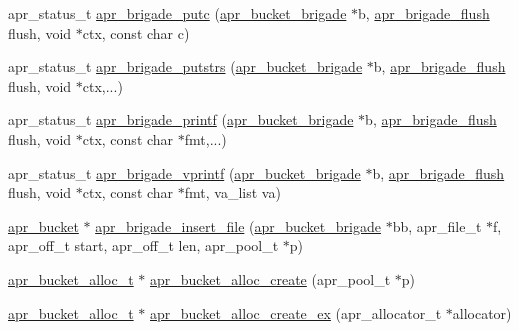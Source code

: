 \begin{DoxyCompactItemize}
\item 
apr\-\_\-status\-\_\-t \hyperlink{group___a_p_r___util___bucket___brigades_ga362999cb255297fd0fd433f03236302d}{apr\-\_\-brigade\-\_\-putc} (\hyperlink{structapr__bucket__brigade}{apr\-\_\-bucket\-\_\-brigade} $\ast$b, \hyperlink{group___a_p_r___util___bucket___brigades_gacdf6dc9d4c81c64834e5e509281f7f16}{apr\-\_\-brigade\-\_\-flush} flush, void $\ast$ctx, const char c)
\item 
apr\-\_\-status\-\_\-t \hyperlink{group___a_p_r___util___bucket___brigades_ga1f27949d92196cbf150b7d6256cbf4b7}{apr\-\_\-brigade\-\_\-putstrs} (\hyperlink{structapr__bucket__brigade}{apr\-\_\-bucket\-\_\-brigade} $\ast$b, \hyperlink{group___a_p_r___util___bucket___brigades_gacdf6dc9d4c81c64834e5e509281f7f16}{apr\-\_\-brigade\-\_\-flush} flush, void $\ast$ctx,...)
\item 
apr\-\_\-status\-\_\-t \hyperlink{group___a_p_r___util___bucket___brigades_ga4120ba3834c545db3b9229d858e33b47}{apr\-\_\-brigade\-\_\-printf} (\hyperlink{structapr__bucket__brigade}{apr\-\_\-bucket\-\_\-brigade} $\ast$b, \hyperlink{group___a_p_r___util___bucket___brigades_gacdf6dc9d4c81c64834e5e509281f7f16}{apr\-\_\-brigade\-\_\-flush} flush, void $\ast$ctx, const char $\ast$fmt,...)
\item 
apr\-\_\-status\-\_\-t \hyperlink{group___a_p_r___util___bucket___brigades_ga9e1af8c10946264e1bb37a3f56e4bfd8}{apr\-\_\-brigade\-\_\-vprintf} (\hyperlink{structapr__bucket__brigade}{apr\-\_\-bucket\-\_\-brigade} $\ast$b, \hyperlink{group___a_p_r___util___bucket___brigades_gacdf6dc9d4c81c64834e5e509281f7f16}{apr\-\_\-brigade\-\_\-flush} flush, void $\ast$ctx, const char $\ast$fmt, va\-\_\-list va)
\item 
\hyperlink{structapr__bucket}{apr\-\_\-bucket} $\ast$ \hyperlink{group___a_p_r___util___bucket___brigades_ga7c4981f7050333a181e440e753c20555}{apr\-\_\-brigade\-\_\-insert\-\_\-file} (\hyperlink{structapr__bucket__brigade}{apr\-\_\-bucket\-\_\-brigade} $\ast$bb, apr\-\_\-file\-\_\-t $\ast$f, apr\-\_\-off\-\_\-t start, apr\-\_\-off\-\_\-t len, apr\-\_\-pool\-\_\-t $\ast$p)
\item 
\hyperlink{group___a_p_r___util___bucket___brigades_ga9a30babfeb6e290db124d8f9b69e49e4}{apr\-\_\-bucket\-\_\-alloc\-\_\-t} $\ast$ \hyperlink{group___a_p_r___util___bucket___brigades_ga2d96fa729a17a86dc5221958e8c13c96}{apr\-\_\-bucket\-\_\-alloc\-\_\-create} (apr\-\_\-pool\-\_\-t $\ast$p)
\item 
\hyperlink{group___a_p_r___util___bucket___brigades_ga9a30babfeb6e290db124d8f9b69e49e4}{apr\-\_\-bucket\-\_\-alloc\-\_\-t} $\ast$ \hyperlink{group___a_p_r___util___bucket___brigades_ga252642139099350d0b987889d5c0868c}{apr\-\_\-bucket\-\_\-alloc\-\_\-create\-\_\-ex} (apr\-\_\-allocator\-\_\-t $\ast$allocator)

\end{DoxyCompactItemize}
